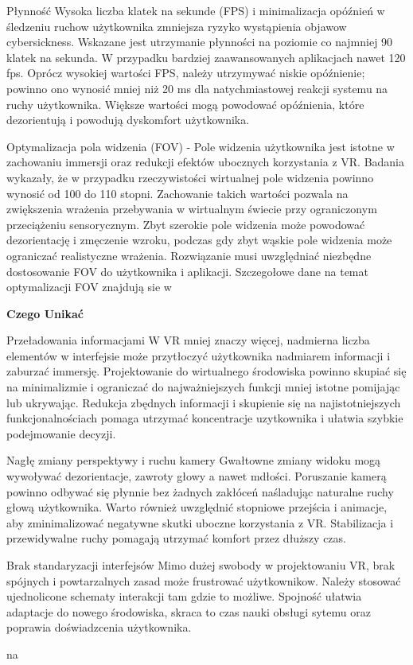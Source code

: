Płynność
Wysoka liczba klatek na sekunde (FPS) i minimalizacja opóźnień w śledzeniu ruchow użytkownika zmniejsza ryzyko wystąpienia objawow cybersickness. Wskazane jest utrzymanie płynności na poziomie co najmniej 90 klatek na sekunda. W przypadku bardziej zaawansowanych aplikacjach  nawet 120 fps. Oprócz wysokiej wartości FPS, należy utrzymywać niskie opóźnienie; powinno ono wynosić mniej niż 20 ms dla natychmiastowej reakcji systemu na ruchy użytkownika. Większe wartości mogą powodować opóźnienia, które dezorientują i powodują dyskomfort użytkownika.

Optymalizacja pola widzenia (FOV) - Pole widzenia użytkownika jest istotne w zachowaniu immersji oraz redukcji efektów ubocznych korzystania z VR. Badania wykazały, że w przypadku rzeczywistości wirtualnej pole widzenia powinno wynosić od 100 do 110 stopni. Zachowanie takich wartości pozwala na zwiększenia wrażenia przebywania w wirtualnym świecie przy ograniczonym przeciążeniu sensorycznym. Zbyt szerokie pole widzenia może powodować dezorientację i zmęczenie wzroku, podczas gdy zbyt wąskie pole widzenia może ograniczać realistyczne wrażenia. Rozwiązanie musi uwzględniać niezbędne dostosowanie FOV do użytkownika i aplikacji. Szczegołowe dane na temat optymalizacji FOV znajdują sie w %


\textbf{Czego Unikać}

Przeładowania informacjami
W VR mniej znaczy więcej, nadmierna liczba elementów w interfejsie może przytłoczyć użytkownika nadmiarem informacji i zaburzać immersję. Projektowanie do wirtualnego środowiska powinno skupiać się na minimalizmie i ograniczać do najważniejszych funkcji mniej istotne pomijając lub ukrywając. Redukcja zbędnych informacji i skupienie się na najistotniejszych funkcjonalnościach pomaga utrzymać koncentracje uzytkownika i ułatwia szybkie podejmowanie decyzji.

Nagłę zmiany perspektywy i ruchu kamery
Gwałtowne zmiany widoku mogą wywoływać dezorientacje, zawroty głowy a nawet mdłości. Poruszanie kamerą powinno odbywać się płynnie bez żadnych zakłóceń  naśladując naturalne ruchy głową użytkownika. Warto również uwzględnić stopniowe przejścia i animacje, aby zminimalizować negatywne skutki uboczne korzystania z VR. Stabilizacja i przewidywalne ruchy pomagają utrzymać komfort przez dłuższy czas. 

Brak standaryzacji interfejsów
Mimo dużej swobody w projektowaniu VR, brak spójnych i powtarzalnych zasad może frustrować użytkownikow. Należy stosować ujednolicone schematy interakcji tam gdzie to możliwe. Spojność ułatwia adaptacje do nowego środowiska, skraca to czas nauki obsługi sytemu oraz poprawia doświadzcenia użytkownika. 



na


